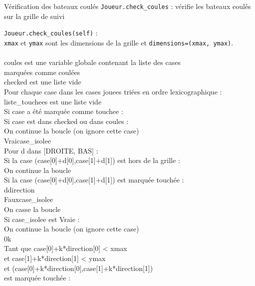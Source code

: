 \begin{frame}{Vérification des bateaux coulés}
\texttt{Joueur.check\_coules} : vérifie les bateaux coulés sur la grille de suivi
\end{frame}

{
\begin{frame}[allowframebreaks]
\texttt{Joueur.check\_coules(self)} :\\
\texttt{xmax} et \texttt{ymax} sont les dimensions de la grille et \texttt{dimensions=(xmax, ymax)}.\\~\\
coules est une variable globale contenant la liste des cases\\
 marquées comme coulées\\
checked est une liste vide\\
Pour chaque case dans les cases jouees triées en ordre lexicographique :\\
liste\_touchees est une liste vide\\
Si case a été marquée comme touchee :\\
Si case est dans checked ou dans coules :\\
On continue la boucle (on ignore cette case)\\
\framebreak
{}Vrai\sto case\_isolee\\
Pour d dans [DROITE, BAS] :\\
Si la case (case[0]+d[0],case[1]+d[1]) est hors de la grille :\\
On continue la boucle\\
Si la case (case[0]+d[0],case[1]+d[1]) est marquée touchée :\\
d\sto direction\\
Faux\sto case\_isolee\\
On casse la boucle\\
Si case\_isolee est Vraie :\\
On continue la boucle (on ignore cette case)\\
\framebreak
{}0\sto k\\
Tant que case[0]+k*direction[0] < xmax\\
et case[1]+k*direction[1] < ymax\\
et (case[0]+k*direction[0],case[1]+k*direction[1])\\
 est marquée touchée :\\

\end{frame}}
